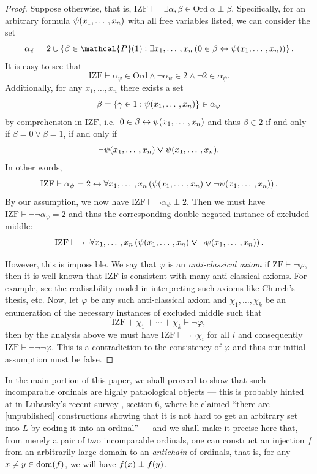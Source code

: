 \documentclass{asl}
\theoremstyle{plain}
\newcommand{\Ord}{\mathrm{Ord}}
\DeclareMathOperator{\dom}{dom}
\begin{document}
\begin{proof}
  Suppose otherwise, that is, $\mathrm{IZF} \vdash \neg \exists \alpha, \beta \in \Ord \ \alpha \perp \beta$. Specifically, for an arbitrary formula $\psi\mleft(x_1, \ldots, x_n\mright)$ with all free variables listed, we can consider the set
  \[\alpha_\psi = 2 \cup \left\{\beta \in \mathcal{P}\mleft(1\mright) : \exists x_1, \ldots, x_n \left(0 \in \beta \leftrightarrow \psi\mleft(x_1, \ldots, x_n\mright)\right)\right\}.\]
  It is easy to see that
  \[\mathrm{IZF} \vdash \alpha_\psi \in \Ord \land \neg \alpha_\psi \in 2 \land \neg 2 \in \alpha_\psi.\]
  Additionally, for any $x_1, \ldots, x_n$ there exists a set
  \[\beta = \left\{\gamma \in 1 : \psi\mleft(x_1, \ldots, x_n\mright)\right\} \in \alpha_\psi\]
  by comprehension in $\mathrm{IZF}$, i.e.\ $0 \in \beta \leftrightarrow \psi\mleft(x_1, \ldots, x_n\mright)$ and thus $\beta \in 2$ if and only if $\beta = 0 \lor \beta = 1$, if and only if
  \[\neg \psi\mleft(x_1, \ldots, x_n\mright) \lor \psi\mleft(x_1, \ldots, x_n\mright).\]
  In other words,
  \[\mathrm{IZF} \vdash \alpha_\psi = 2 \leftrightarrow \forall x_1, \ldots, x_n \left(\psi\mleft(x_1, \ldots, x_n\mright) \lor \neg \psi\mleft(x_1, \ldots, x_n\mright)\right).\]
  By our assumption, we now have $\mathrm{IZF} \vdash \neg \alpha_\psi \perp 2$. Then we must have $\mathrm{IZF} \vdash \neg \neg \alpha_\psi = 2$ and thus the corresponding double negated instance of excluded middle:
  \[\mathrm{IZF} \vdash \neg \neg \forall x_1, \ldots, x_n \left(\psi\mleft(x_1, \ldots, x_n\mright) \lor \neg \psi\mleft(x_1, \ldots, x_n\mright)\right).\]

  However, this is impossible. We say that $\varphi$ is an \emph{anti-classical axiom} if $\mathrm{ZF} \vdash \neg \varphi$, then it is well-known that $\mathrm{IZF}$ is consistent with many anti-classical axioms. For example, see the realisability model in \cite{chen-rm-rathjen12-lifschitz-realizability} interpreting such axioms like Church's thesis, etc. Now, let $\varphi$ be any such anti-classical axiom and $\chi_1, \ldots, \chi_k$ be an enumeration of the necessary instances of excluded middle such that
  \[\mathrm{IZF} + \chi_1 + \cdots + \chi_k \vdash \neg \varphi,\]
  then by the analysis above we must have $\mathrm{IZF} \vdash \neg \neg \chi_i$ for all $i$ and consequently $\mathrm{IZF} \vdash \neg \neg \neg \varphi$. This is a contradiction to the consistency of $\varphi$ and thus our initial assumption must be false.
\end{proof}

In the main portion of this paper, we shall proceed to show that such incomparable ordinals are highly pathological objects --- this is probably hinted at in Lubarsky's recent survey \cite{lubarsky23-inner-outer-models-cst}, section 6, where he claimed ``there are [unpublished] constructions showing that it is not hard to get an arbitrary set into $L$ by coding it into an ordinal'' --- and we shall make it precise here that, from merely a pair of two incomparable ordinals, one can construct an injection $f$ from an arbitrarily large domain to an \emph{antichain} of ordinals, that is, for any $x \neq y \in \dom\mleft(f\mright)$, we will have $f\mleft(x\mright) \perp f\mleft(y\mright)$.
\end{document}
